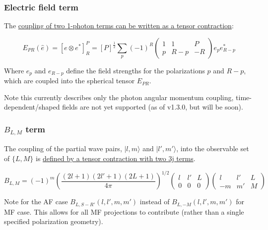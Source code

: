 \subsubsection{Electric field term}\label{electric-field-term}

The
\href{https://epsproc.readthedocs.io/en/latest/methods/geometric_method_dev_260220_090420_tidy.html\#E_\%7BP,R\%7D-tensor}{coupling
of two 1-photon terms can be written as a tensor contraction}:

\begin{equation}
E_{PR}(\hat{e})=[e\otimes e^{*}]_{R}^{P}=[P]^{\frac{1}{2}}\sum_{p}(-1)^{R}\left(\begin{array}{ccc}
1 & 1 & P\\
p & R-p & -R
\end{array}\right)e_{p}e_{R-p}^{*}\label{eq:EPR-defn-1}
\end{equation}

Where \(e_{p}\) and \(e_{R-p}\) define the field strengths for the
polarizations \(p\) and \(R-p\), which are coupled into the spherical
tensor \(E_{PR}\).

Note this currently describes only the photon angular momentum coupling,
time-dependent/shaped fields are not yet supported (as of v1.3.0, but
will be soon).

\subsubsection{\texorpdfstring{\(B_{L,M}\)
term}{B\_\{L,M\} term}}\label{b_lm-term}

The coupling of the partial wave pairs, \(|l,m\rangle\) and
\(|l',m'\rangle\), into the observable set of \(\{L,M\}\) is
\href{https://epsproc.readthedocs.io/en/latest/methods/geometric_method_dev_260220_090420_tidy.html\#B_\%7BL,M\%7D-term}{defined
by a tensor contraction with two 3j terms}.

\begin{equation}
B_{L,M}=(-1)^{m}\left(\frac{(2l+1)(2l'+1)(2L+1)}{4\pi}\right)^{1/2}\left(\begin{array}{ccc}
l & l' & L\\
0 & 0 & 0
\end{array}\right)\left(\begin{array}{ccc}
l & l' & L\\
-m & m' & M
\end{array}\right)
\end{equation}

Note for the AF case \(B_{L,S-R'}(l,l',m,m')\) instead of
\(B_{L,-M}(l,l',m,m')\) for MF case. This allows for all MF projections
to contribute (rather than a single specified polarization geometry).

